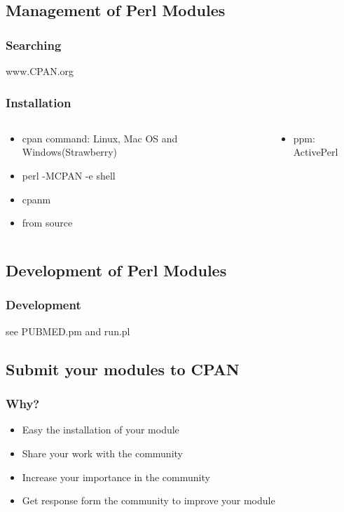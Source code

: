 \documentclass[UTF8]{beamer}
\begin{document}
\subsection{Management of Perl Modules}

\begin{frame}
  \frametitle{Searching}
  \centerline{www.CPAN.org}
\end{frame}

\begin{frame}
  \frametitle{Installation}
\begin{columns}
  \begin{column}{.5\textwidth}
    \begin{itemize}
      \item cpan command: Linux, Mac OS and Windows(Strawberry)
      \item perl -MCPAN -e shell
      \item cpanm
      \item from source
    \end{itemize}
  \end{column}
  \begin{column}{.5\textwidth}
    \begin{itemize}
      \item ppm: ActivePerl
    \end{itemize}
  \end{column}
\end{columns}
\end{frame}



\subsection{Development of Perl Modules}

\begin{frame}
  \frametitle{Development}
  see PUBMED.pm and run.pl
\end{frame}

\subsection{Submit your modules to CPAN}

\begin{frame}
  \frametitle{Why?}
  \begin{itemize}
    \item Easy the installation of your module
    \item Share your work with the community
    \item Increase your importance in the community
    \item Get response form the community to improve your module
  \end{itemize}
\end{frame}
\end{document}
